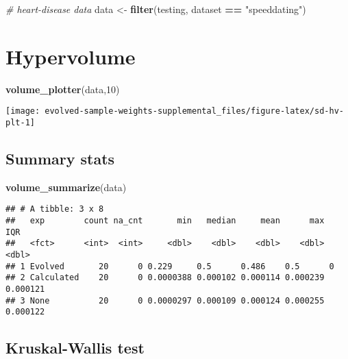 \documentclass[
]{book}
\newenvironment{Shaded}{\begin{snugshade}}{\end{snugshade}}
\newcommand{\CommentTok}[1]{\textcolor[rgb]{0.56,0.35,0.01}{\textit{#1}}}
\newcommand{\DecValTok}[1]{\textcolor[rgb]{0.00,0.00,0.81}{#1}}
\newcommand{\FunctionTok}[1]{\textcolor[rgb]{0.13,0.29,0.53}{\textbf{#1}}}
\newcommand{\NormalTok}[1]{#1}
\newcommand{\OtherTok}[1]{\textcolor[rgb]{0.56,0.35,0.01}{#1}}
\newcommand{\SpecialCharTok}[1]{\textcolor[rgb]{0.81,0.36,0.00}{\textbf{#1}}}
\newcommand{\StringTok}[1]{\textcolor[rgb]{0.31,0.60,0.02}{#1}}
\begin{document}
\begin{Shaded}
\begin{Highlighting}[]
\CommentTok{\# heart{-}disease data}
\NormalTok{data }\OtherTok{\textless{}{-}} \FunctionTok{filter}\NormalTok{(testing, dataset }\SpecialCharTok{==} \StringTok{"speeddating"}\NormalTok{)}
\end{Highlighting}
\end{Shaded}

\hypertarget{hypervolume-9}{%
\section{Hypervolume}\label{hypervolume-9}}

\begin{Shaded}
\begin{Highlighting}[]
\FunctionTok{volume\_plotter}\NormalTok{(data,}\DecValTok{10}\NormalTok{)}
\end{Highlighting}
\end{Shaded}

\texttt{[image: evolved-sample-weights-supplemental\_files/figure-latex/sd-hv-plt-1]}

\hypertarget{summary-stats-9}{%
\subsection{Summary stats}\label{summary-stats-9}}

\begin{Shaded}
\begin{Highlighting}[]
\FunctionTok{volume\_summarize}\NormalTok{(data)}
\end{Highlighting}
\end{Shaded}

\begin{verbatim}
## # A tibble: 3 x 8
##   exp        count na_cnt       min   median     mean      max      IQR
##   <fct>      <int>  <int>     <dbl>    <dbl>    <dbl>    <dbl>    <dbl>
## 1 Evolved       20      0 0.229     0.5      0.486    0.5      0       
## 2 Calculated    20      0 0.0000388 0.000102 0.000114 0.000239 0.000121
## 3 None          20      0 0.0000297 0.000109 0.000124 0.000255 0.000122
\end{verbatim}

\hypertarget{kruskal-wallis-test-9}{%
\subsection{Kruskal-Wallis test}\label{kruskal-wallis-test-9}}
\end{document}
